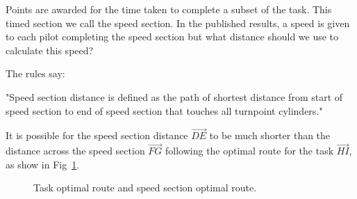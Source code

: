\documentclass[gap.tex]{subfiles}
\begin{document}
\label{sec:speed-section-route}
Points are awarded for the time taken to complete a subset of the task. This
timed section we call the speed section. In the published results, a speed is
given to each pilot completing the speed section but what distance should we
use to calculate this speed?

The rules say:

"Speed section distance is defined as the path of shortest distance from start
of speed section to end of speed section that touches all turnpoint cylinders."

It is possible for the speed section distance $\overrightarrow{DE}$ to be much
shorter than the distance across the speed section $\overrightarrow{FG}$
following the optimal route for the task $\overrightarrow{HI}$, as show in
Fig~\ref{fig:speed-section-optimal-route}.

\begin{figure}[ht]
    \centering
    
    \caption{Task optimal route and speed section optimal route.}
    \label{fig:speed-section-optimal-route}
\end{figure}
\end{document}
